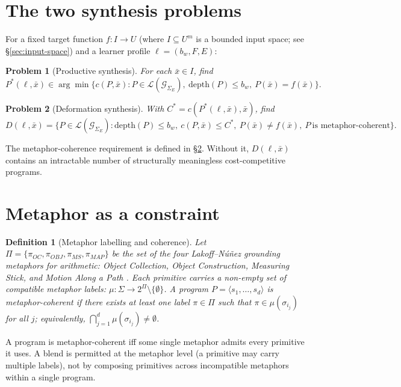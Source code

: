 \documentclass[11pt]{article}
\newtheorem{definition}{Definition}
\newtheorem{problem}{Problem}
\begin{document}
\section{The two synthesis problems}

For a fixed target function $f:I \to U$ (where $I \subseteq U^m$ is a
bounded input space; see \S\ref{sec:input-space}) and a learner profile
$\ell = (b_w, F, E)$:

\begin{problem}[Productive synthesis]
\label{prob:productive}
For each $\bar{x} \in I$, find
\[
P^*(\ell, \bar{x}) \in \arg\min \big\{ c(P, \bar{x}) :
P \in \mathcal{L}(\mathcal{G}_{\Sigma_E}),\
\mathrm{depth}(P) \le b_w,\ P(\bar{x}) = f(\bar{x}) \big\}.
\]
\end{problem}

\begin{problem}[Deformation synthesis]
\label{prob:deformation}
With $C^* = c(P^*(\ell, \bar{x}), \bar{x})$, find
\[
D(\ell, \bar{x}) = \big\{ P \in \mathcal{L}(\mathcal{G}_{\Sigma_E}) :
\mathrm{depth}(P) \le b_w,\ c(P, \bar{x}) \le C^*,\ P(\bar{x}) \ne
f(\bar{x}),\ P\ \text{is metaphor-coherent} \big\}.
\]
\end{problem}

The metaphor-coherence requirement is defined in
\S\ref{sec:metaphor}. Without it, $D(\ell, \bar{x})$ contains an
intractable number of structurally meaningless cost-competitive
programs.

\section{Metaphor as a constraint}
\label{sec:metaphor}

\begin{definition}[Metaphor labelling and coherence]
Let $\Pi = \{\pi_{OC}, \pi_{OBJ}, \pi_{MS}, \pi_{MAP}\}$ be the set of
the four Lakoff--N\'u\~nez grounding metaphors for arithmetic:
\emph{Object Collection}, \emph{Object Construction},
\emph{Measuring Stick}, and \emph{Motion Along a Path}
\parencite{lakoffNunez2000}. Each primitive carries a non-empty set of
compatible metaphor labels: $\mu:\Sigma \to 2^\Pi \setminus
\{\emptyset\}$. A program $P = \langle s_1, \dots, s_d \rangle$ is
\emph{metaphor-coherent} if there exists at least one label
$\pi \in \Pi$ such that $\pi \in \mu(\sigma_{i_j})$ for all $j$;
equivalently, $\bigcap_{j=1}^{d} \mu(\sigma_{i_j}) \ne \emptyset$.
\end{definition}

A program is metaphor-coherent iff some single metaphor admits every
primitive it uses. A blend is permitted at the metaphor level (a
primitive may carry multiple labels), not by composing primitives
across incompatible metaphors within a single program.
\end{document}

